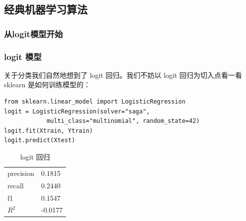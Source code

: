 \subsection{经典机器学习算法}
\subsubsection{从logit模型开始}
\begin{frame}[fragile]
    \frametitle{logit 模型}
    关于分类我们自然地想到了 logit 回归。我们不妨以 logit 回归为切入点看一看 sklearn 是如何训练模型的：

    \begin{verbatim}
from sklearn.linear_model import LogisticRegression
logit = LogisticRegression(solver="saga",
            multi_class="multinomial", random_state=42)
logit.fit(Xtrain, Ytrain)
logit.predict(Xtest)
    \end{verbatim}

    \begin{table}
        \caption{logit 回归}
        \begin{tabular}{ll}
            precision & 0.1815  \\
            recall    & 0.2440  \\
            f1        & 0.1547  \\
            \(R^2\)   & -0.0177 \\
        \end{tabular}
        \label{logit}
    \end{table}
\end{frame}
